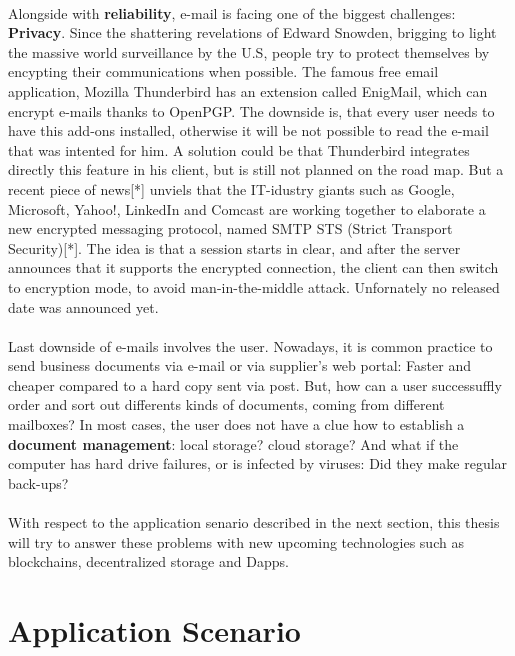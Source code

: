 \paragraph{}
Alongside with \textbf{reliability}, e-mail is facing one of the biggest challenges: \textbf{Privacy}. Since the shattering revelations of Edward Snowden, brigging to light the massive world surveillance by the U.S, people try to protect themselves by encypting their communications when possible. The famous free email application, Mozilla Thunderbird has an extension called EnigMail, which can encrypt e-mails thanks to OpenPGP. The downside is, that every user needs to have this add-ons installed, otherwise it will be not possible to read the e-mail that was intented for him. A solution could be that Thunderbird integrates directly this feature in his client, but is still not planned on the road map.
But a recent piece of news[*] unviels that the IT-idustry giants such as Google, Microsoft, Yahoo!, LinkedIn and Comcast are working together to elaborate a new encrypted messaging protocol, named SMTP STS (Strict Transport Security)[*]. The idea is that a session starts in clear, and after the server announces that it supports the encrypted connection, the client can then switch to encryption mode, to avoid man-in-the-middle attack. Unfornately no released date was announced yet. 
\paragraph{}
Last downside of e-mails involves the user. Nowadays, it is common practice to send business documents via e-mail or via supplier\textquoteright s web portal: Faster and cheaper compared to a hard copy sent via post. But, how can a user successuffly order and sort out differents kinds of documents, coming from different mailboxes? In most cases, the user does not have a clue how to establish a \textbf{document management}: local storage? cloud storage? And what if the computer has hard drive failures, or is infected by viruses: Did they make regular back-ups?
\paragraph{}
With respect to the application senario described in the next section, this thesis will try to answer these problems with new upcoming technologies such as blockchains, decentralized storage and Dapps. 
 
\section {Application Scenario}
